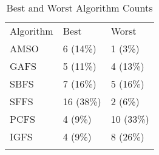\begin{table}
\caption{Best and Worst Algorithm Counts}
\label{tbl:best:worst:count}
\begin{tabular}{lll}
\noalign{\smallskip}\hline\noalign{\smallskip}
Algorithm&Best&Worst\\
\noalign{\smallskip}\hline
AMSO&6 (14\%)&1 (3\%)\\
GAFS&5 (11\%)&4 (13\%)\\
SBFS&7 (16\%)&5 (16\%)\\
SFFS&16 (38\%)&2 (6\%)\\
PCFS&4 (9\%)&10 (33\%)\\
IGFS&4 (9\%)&8 (26\%)\\
\noalign{\smallskip}\hline
\end{tabular}
\end{table}
